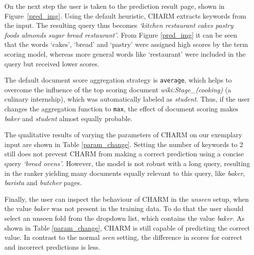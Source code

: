 On the next step the user is taken to the prediction result page, shown in Figure~\ref{pred_img}. Using the default heuristic, CHARM extracts  keywords from the input.
The resulting query thus becomes \textit{`kitchen restaurant cakes pastry foods almonds sugar bread restaurant'}. From Figure \ref{pred_img} it can be seen that the words `cakes', `bread' and `pastry' were assigned high scores by the term scoring model, whereas more general words like `restaurant' were included in the query but received lower scores.

The default document score aggregation strategy is \texttt{average}, which helps to overcome the influence of the top scoring document \emph{wiki:Stage\_(cooking)} (a culinary internship), which was automatically labeled as \textit{student}. 
Thus, if the user changes the aggregation function to \texttt{max}, the effect of document scoring makes \emph{baker} and \emph{student} almost equally probable. 

The qualitative results of varying the parameters of CHARM on our exemplary input are shown in Table \ref{param_change}. 
Setting the number of keywords to 2 still does not prevent CHARM from making a correct prediction using a concise query \textit{`bread ovens'}. However, the model is not robust with a long query, resulting in the ranker yielding many documents equally relevant to this query, like \emph{baker}, \emph{barista} and \emph{butcher} pages.

Finally, the user can inspect the behaviour of CHARM in the \emph{unseen} setup, when the value \emph{baker} was not present in the training data. To do that the user should select an unseen fold from the dropdown list, which contains the value \emph{baker}. As shown in Table \nolinebreak\ref{param_change}, CHARM is still capable of predicting the correct value. In contrast to the normal \textit{seen} setting, the difference in scores for correct and incorrect predictions is less.

